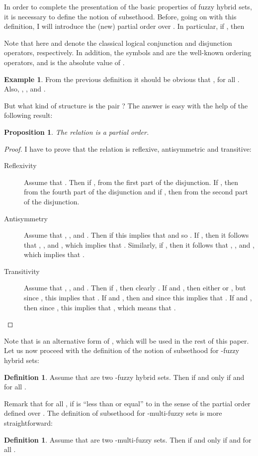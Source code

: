 \documentclass{amsart}
\newtheorem{proposition}[theorem]{Proposition}
\theoremstyle{definition}
\newtheorem{definition}[theorem]{Definition}
\newtheorem{example}[theorem]{Example}
\begin{document}
In order to complete the presentation of the basic properties of fuzzy hybrid sets, it is
necessary to define the notion of subsethood. Before, going on with this definition, I
will introduce the (new) partial order  over . In particular, if
, then 

Note that here  and  denote the classical 
logical conjunction and disjunction operators, respectively. In addition, the symbols  and  
are the well-known ordering operators, and  is the absolute value of . 
\begin{example}
From the previous definition it should be obvious that , for all . Also,
, , and .
\end{example}


But what kind of structure is
the pair ? The answer is easy with the help of the following
result: 
\begin{proposition}
The relation  is a partial order.
\end{proposition}
\begin{proof}
I have to prove that the relation  is reflexive, antisymmetric and transitive:
\begin{description}
\item[Reflexivity] Assume that . Then if ,  from the
first part of the disjunction. If , then  from the fourth part of the
disjunction and if , then  from the second part of the disjunction.
\item[Antisymmetry] Assume that , , and . Then
if  this implies that  and so . If , then it follows that ,
, and , which implies that . Similarly, if , then it
follows that , , and , which implies that .
\item[Transitivity] Assume that , , and .
Then if , then clearly . If  and , then either  or , but
since , this implies that . If  and , then  and since 
 this implies that . If  and , then since , this implies
that , which means that .
\end{description}
\end{proof} 
Note that  is an alternative form of , which will be used in the rest
of this paper. Let us now proceed with the definition of the notion of subsethood for 
-fuzzy hybrid sets:
\begin{definition}
Assume that  are two -fuzzy 
hybrid sets. Then  if and only if 
 and
 for all .
\end{definition} 
Remark that for all ,  if  is ``less 
than or equal'' to  in the sense of the partial order defined over . The
definition of subsethood for -multi-fuzzy sets is more straightforward:
\begin{definition}
Assume that  are two 
-multi-fuzzy sets. Then  if and only if 
 and
 for all .
\end{definition} 
\end{document}
